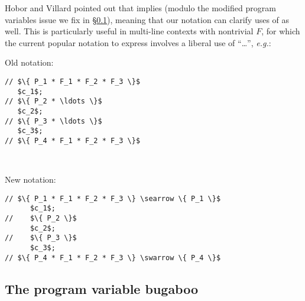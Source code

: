 Hobor and Villard pointed out that  implies  (modulo the modified program variables issue we fix in \S\ref{sec:freevars}), meaning that our notation can clarify uses of  as well.  This is particularly useful in multi-line contexts with nontrivial $F$, for which the current popular notation to express  involves a liberal use of ``\ldots'', \emph{e.g.}:

\vspace{5pt}

\begin{minipage}{.19\textwidth}
Old notation:
\begin{lstlisting}
// $\{ P_1 * F_1 * F_2 * F_3 \}$
   $c_1$;
// $\{ P_2 * \ldots \}$
   $c_2$;
// $\{ P_3 * \ldots \}$
   $c_3$;
// $\{ P_4 * F_1 * F_2 * F_3 \}$
\end{lstlisting}
\end{minipage} \vline ~~~
\begin{minipage}{.2\textwidth}
New notation:
\begin{lstlisting}[numbers=none]
// $\{ P_1 * F_1 * F_2 * F_3 \} \searrow \{ P_1 \}$
      $c_1$;
//    $\{ P_2 \}$
      $c_2$;
//    $\{ P_3 \}$
      $c_3$;
// $\{ P_4 * F_1 * F_2 * F_3 \} \swarrow \{ P_4 \}$
\end{lstlisting}
\end{minipage}

\subsection{The program variable bugaboo}
\label{sec:freevars}

